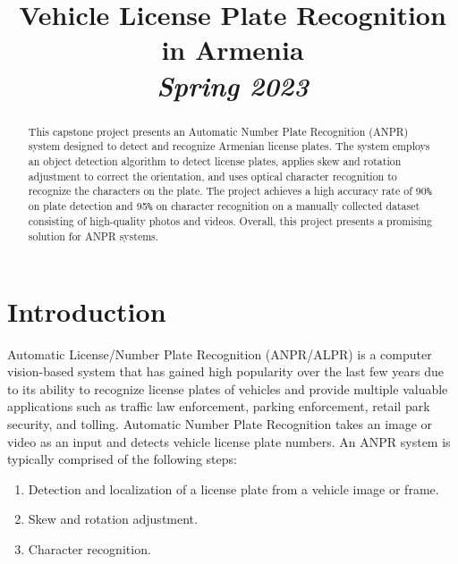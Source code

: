 \documentclass[conference]{IEEEtran}
\begin{document}
\title{Vehicle License Plate Recognition in Armenia\\
\textit{Spring 2023}}

\author{
\and
{}
}
\maketitle

\begin{abstract}
This capstone project presents an Automatic Number Plate Recognition (ANPR) system designed to detect and recognize Armenian license plates. The system employs an object detection algorithm to detect license plates, applies skew and rotation adjustment to correct the orientation, and uses optical character recognition to recognize the characters on the plate. The project achieves a high accuracy rate of 90\verb|%| on plate detection and 95\verb|%| on character recognition on a manually collected dataset consisting of high-quality photos and videos. Overall, this project presents a promising solution for ANPR systems.
\end{abstract}

\section{Introduction}

Automatic License/Number Plate Recognition (ANPR/ALPR) is a computer vision-based system that has gained high popularity over the last few years due to its ability to recognize license plates of vehicles and provide multiple valuable applications such as traffic law enforcement, parking enforcement, retail park security, and tolling.
Automatic Number Plate Recognition takes an image or video as an input and detects vehicle license plate numbers. 
An ANPR system is typically comprised of the following steps:
\begin{enumerate}
    \item Detection and localization of a license plate from a vehicle image or frame.
    \item Skew and rotation adjustment.
    \item Character recognition.
\end{enumerate}
\end{document}
